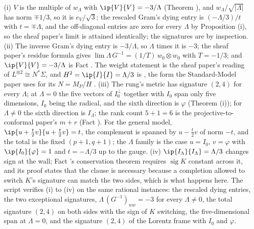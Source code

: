 (i) $V$ is the multiple of $w_{\Lambda}$ with $\ip{V}{V} = -3/\Lambda$ (Theorem ), and $w_{\Lambda}/\sqrt{|\Lambda|}$ has norm $\mp 1/3$, so it is $e_{V}/\sqrt 3$; the rescaled Gram's dying entry is $(-\Lambda/3)/t$ with $t = \mp\Lambda$, and the off-diagonal entries are zero for every $\Lambda$ by Proposition (i), so the sheaf paper's limit is attained identically; the signatures are by inspection. (ii) The inverse Gram's dying entry is $-3/\Lambda$, so $\Lambda$ times it is $-3$; the sheaf paper's residue formula gives $\lim \Lambda\, G^{-1} = (1/T)\,w_{0} \otimes w_{0}$ with $T = -1/3$; and $\ip{V}{V} = -3/\Lambda$ is Fact . The weight statement is the sheaf paper's reading of $L^{\otimes 2} \cong N^{*}\Sigma$, and $H^{2} = \ip{I}{I} = \Lambda/3$ is \cite[Fact~2.5]{ButlerT12}, the form the Standard-Model paper uses for its $N = M_{P}/H$ \cite[Obs.~7.1]{ButlerT12}. (iii) The rung's metric has signature $(2,4)$ for every $\Lambda$; at $\Lambda = 0$ the five vectors of $I_{0}^{\perp}$ together with $I_{0}$ span only five dimensions, $I_{0}$ being the radical, and the sixth direction is $\varphi$ (Theorem (i)); for $\Lambda \neq 0$ the sixth direction is $I_{\Lambda}$; the rank count $5 + 1 = 6$ is the projective-to-conformal paper's $m + r$ (Fact ). For the general model, $\ip{u + \tfrac{t}{2}v}{u + \tfrac{t}{2}v} = t$, the complement is spanned by $u - \tfrac{t}{2}v$ of norm $-t$, and the total is the fixed $(p+1,q+1)$; the $\Lambda$ family is the case $u = I_{0}$, $v = \varphi$ with $\ip{I_{0}}{\varphi} = 1$ and $t = -\Lambda/3$ up to the gauge. (iv) $\ip{I_{\Lambda}}{I_{\Lambda}} = \Lambda/3$ changes sign at the wall; Fact 's conservation theorem requires $\operatorname{sig} K$ constant across it, and its proof states that the clause is necessary because a completion allowed to switch $K$'s signature can match the two sides, which is what happens here. The script verifies (i) to (iv) on the same rational instances: the rescaled dying entries, the two exceptional signatures, $\Lambda\,(G^{-1})_{ww} = -3$ for every $\Lambda \neq 0$, the total signature $(2,4)$ on both sides with the sign of $K$ switching, the five-dimensional span at $\Lambda = 0$, and the signature $(2,4)$ of the Lorentz frame with $I_{0}$ and $\varphi$.
